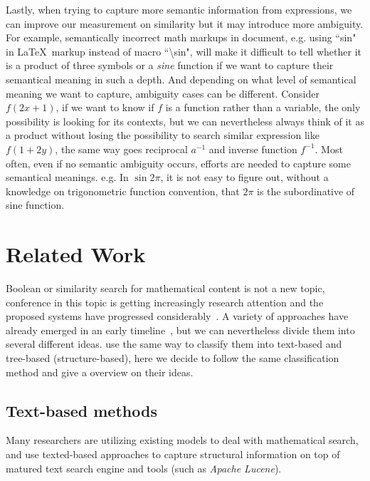 Lastly, when trying to capture more semantic information from expressions, we can improve our measurement on similarity but it may introduce more ambiguity. 
For example, semantically incorrect math markups in document, e.g. using ``sin" in \LaTeX\ markup instead of macro ``\textbackslash sin", will make it difficult to tell whether it is a product of three symbols or a \textit{sine} function if we want to capture their semantical meaning in such a depth. 
And depending on what level of semantical meaning we want to capture, ambiguity cases can be different. 
Consider $f(2x+1)$, if we want to know if $f$ is a function rather than a variable, the only possibility is looking for its contexts, but we can nevertheless always think of it as a product without losing the possibility to search similar expression like $f(1 + 2y)$, the same way goes reciprocal $a^{-1}$ and inverse function $f^{-1}$. 
Most often, even if no semantic ambiguity occurs, efforts are needed to capture some semantical meanings. e.g. In $\sin 2 \pi$, it is not easy to figure out,
 without a knowledge on trigonometric function convention, that $2 \pi$ is the subordinative of sine function.


\section{Related Work}
\label{relatedwork}
Boolean or similarity search for mathematical content is not a new topic, conference in this topic is getting increasingly research attention and the proposed systems have progressed considerably~\cite{ov}. 
A variety of approaches have already emerged in an early timeline~\cite{egomath13}, but we can nevertheless divide them into several different ideas.
\cite{WikiMirs13,symbolpairs15,Youssef14} use the same way to classify them into text-based and tree-based (structure-based),
here we decide to follow the same classification method and give a overview on their ideas.

\subsection{Text-based methods}
Many researchers are utilizing existing models to deal with mathematical search, and use texted-based approaches to capture structural information on top of matured text search engine and tools (such as \textit{Apache Lucene}). 


